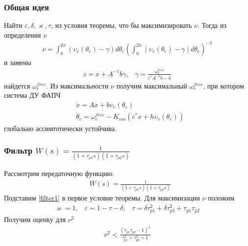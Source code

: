 \documentclass{beamer}
\begin{document}
\begin{frame}
\frametitle{Общая идея}
Найти $\varepsilon, \delta, \varkappa, \tau$, из условия теоремы, что бы максимизировать $\nu$. Тогда из определения $\nu$ 
\begin{equation}
 \begin{aligned}
\nu = \int_{0}^{2\pi} (\upsilon_e(\theta_e) - \gamma) d\theta_e \left(\int_{0}^{2\pi} \mid \upsilon_e(\theta_e) - \gamma \mid d\theta_e\right)^{-1} \end{aligned}
\end{equation}
и замены
 \begin{equation}
 \begin{aligned}
 z = x + A^{-1}b\gamma  \text{,} \quad \gamma = \frac{\omega_e^{free}}{c^*A^{-1}b-h}
 \end{aligned}
\end{equation}
 найдется $\omega_e^{free}$. Из максимальности $\nu$ получим максимальный $\omega_e^{free}$, при котором система ДУ ФАПЧ
 \begin{equation*}
 \begin{aligned}
 &\dot{x} = Ax + b\upsilon_e(\theta_e) \\ 
 &\dot{\theta}_e = \omega_e^{free} - K_{vco}(c^*x + h\upsilon_e(\theta_e))
 \end{aligned}
\end{equation*} 
глобально ассимтотически устойчива.
\end{frame}


\begin{frame}
\frametitle{Фильтр $W(s) = \frac{1}{(1+\tau_{p1}s)(1+\tau_{p2}s)}$}
Рассмотрим передаточную функцию:
 \begin{equation}\label{filter1}
 \begin{aligned}
&W(s) = \frac{1}{(1+\tau_{p1}s)(1+\tau_{p2}s)}
 \end{aligned}
\end{equation}
Подставим \eqref{filter1} в первое условие теоремы. Для максимизации $\nu$ положим 
\begin{equation}
 \begin{aligned}
\varkappa = 1 \text{,} \quad \varepsilon = 1 - \tau - \delta \text{,} \quad \tau = \delta \tau_{p1}^2 + \delta \tau_{p2}^2 + \tau_{p1}\tau_{p2}
 \end{aligned}
\end{equation}
Получим оценку для $\nu^2$
\begin{equation}\label{filter1_max}
 \begin{aligned}
\nu^2 < \frac{(\tau_{p1}\tau_{p2} - 1)^2}{\tau_{p1}^2 + \tau_{p2}^2 + 1}
 \end{aligned}
\end{equation} 
\end{frame}
\end{document}
